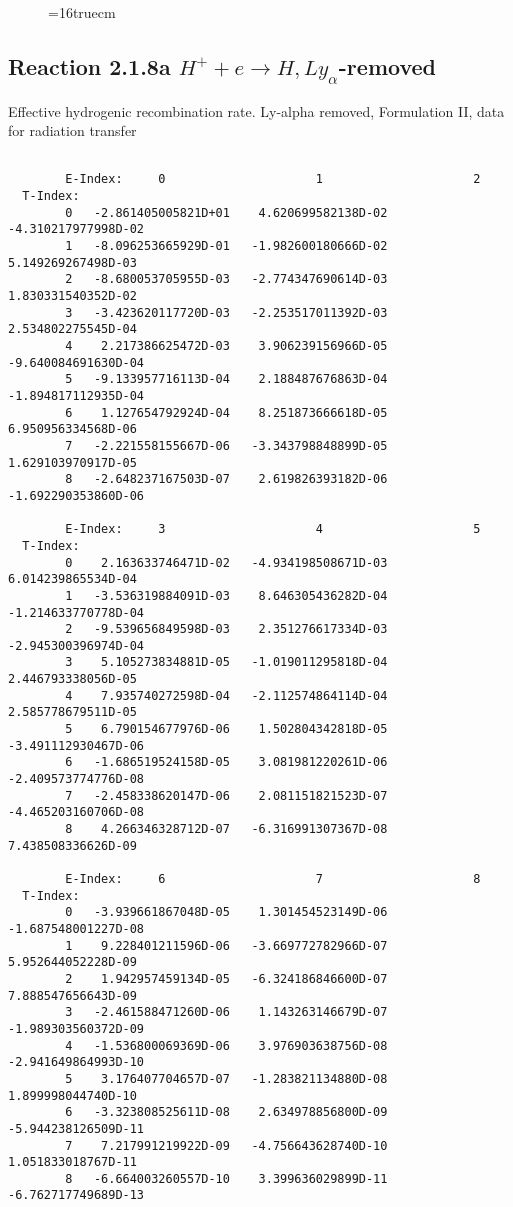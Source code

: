 \documentclass[12pt]{article}
\begin{document}
\begin{figure} \label{2.1.5e}
\epsfxsize=16truecm
\end{figure}
\newpage
\subsection{
Reaction 2.1.8a  $H^+ + e \rightarrow H, Ly_\alpha$-removed
}


   Effective hydrogenic recombination rate.
   Ly-alpha removed, Formulation II, data for radiation transfer

\begin{small}\begin{verbatim}

        E-Index:     0                     1                     2
  T-Index:
        0   -2.861405005821D+01    4.620699582138D-02   -4.310217977998D-02
        1   -8.096253665929D-01   -1.982600180666D-02    5.149269267498D-03
        2   -8.680053705955D-03   -2.774347690614D-03    1.830331540352D-02
        3   -3.423620117720D-03   -2.253517011392D-03    2.534802275545D-04
        4    2.217386625472D-03    3.906239156966D-05   -9.640084691630D-04
        5   -9.133957716113D-04    2.188487676863D-04   -1.894817112935D-04
        6    1.127654792924D-04    8.251873666618D-05    6.950956334568D-06
        7   -2.221558155667D-06   -3.343798848899D-05    1.629103970917D-05
        8   -2.648237167503D-07    2.619826393182D-06   -1.692290353860D-06

        E-Index:     3                     4                     5
  T-Index:
        0    2.163633746471D-02   -4.934198508671D-03    6.014239865534D-04
        1   -3.536319884091D-03    8.646305436282D-04   -1.214633770778D-04
        2   -9.539656849598D-03    2.351276617334D-03   -2.945300396974D-04
        3    5.105273834881D-05   -1.019011295818D-04    2.446793338056D-05
        4    7.935740272598D-04   -2.112574864114D-04    2.585778679511D-05
        5    6.790154677976D-06    1.502804342818D-05   -3.491112930467D-06
        6   -1.686519524158D-05    3.081981220261D-06   -2.409573774776D-08
        7   -2.458338620147D-06    2.081151821523D-07   -4.465203160706D-08
        8    4.266346328712D-07   -6.316991307367D-08    7.438508336626D-09

        E-Index:     6                     7                     8
  T-Index:
        0   -3.939661867048D-05    1.301454523149D-06   -1.687548001227D-08
        1    9.228401211596D-06   -3.669772782966D-07    5.952644052228D-09
        2    1.942957459134D-05   -6.324186846600D-07    7.888547656643D-09
        3   -2.461588471260D-06    1.143263146679D-07   -1.989303560372D-09
        4   -1.536800069369D-06    3.976903638756D-08   -2.941649864993D-10
        5    3.176407704657D-07   -1.283821134880D-08    1.899998044740D-10
        6   -3.323808525611D-08    2.634978856800D-09   -5.944238126509D-11
        7    7.217991219922D-09   -4.756643628740D-10    1.051833018767D-11
        8   -6.664003260557D-10    3.399636029899D-11   -6.762717749689D-13


\end{verbatim}
\end{small}
\end{document}
